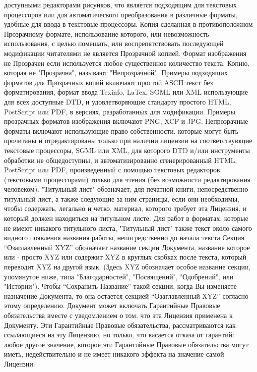  доступными редакторами рисунков, что является подходящим для текстовых процессоров или для автоматического преобразования
 в различные форматы, удобные для ввода в текстовые процессоры. Копия сделанная в противоположном Прозрачному формате,
 использование которого, или невозможность использования, с целью помешать, или воспрепятствовать последующей модификации
 читателями не является Прозрачной копией. Формат изображения не Прозрачен если используется любое существенное количество
 текста. Копию, которая не "Прозрачна", называют "Непрозрачной".
Примеры подходящих форматов для Прозрачных копий включают простой ASCII текст без форматирования, формат ввода Texinfo,
 LaTex, SGML или XML использующие для всех доступные DTD, и удовлетворяющие стандарту простого HTML, PostScript или PDF,
 в версиях, разработанных для модификации.
Примеры прозрачных форматов изображения включают PNG, XCF и JPG. Непрозрачные форматы включают использующие право
 собственности, которые могут быть прочитаны и отредактированы только при наличии лицензии на соответствующие текстовые
 процессоры, SGML или XML, для которого DTD и/или инструменты обработки не общедоступны, и  автоматизированно
 сгенерированный HTML, PostScript или PDF, произведенный с помощью текстовых редакторов (текстовыми процессорами)
 только для чтения (без возможности редактирования человеком).
"Титульный лист" обозначает, для печатной книги, непосредственно  титульный лист, а также следующие за ним страницы,
 если они необходимы, чтобы содержать, легально и четко, материал, которого  требует эта Лицензия, и который должен 
находиться на титульном листе. Для работ в форматах, которые не имеют никакого титульного листа,  "Титульный лист" 
также текст около самого видного появления названия работы, непосредственно до начала текста
Секция “Озаглавленный XYZ” обозначает название секции Документа, название которое или - просто XYZ или содержит XYZ 
в круглых скобках после текста, который переводит XYZ на другой язык. (Здесь XYZ обозначает особое название секции,
 упомянутое ниже, типа "Благодарностей", "Посвящений", "Одобрений", или "Истории"). Чтобы “Сохранить Название” такой
 секции, когда Вы изменяете назначение Документа, то она остается секцией “Озаглавленный XYZ” согласно этому определению.
Документ может включать Гарантийные Правовые обязательства вместе с уведомлением о том, что эта Лицензия применена к
 Документу. Эти Гарантийные Правовые обязательства, рассматриваются как ссылающиеся на эту Лицензию, но только, что
 касается отказа от гарантий: любое другое значение, которое эти Гарантийные Правовые обязательства могут иметь,
 недействительно и не имеет никакого эффекта на значение самой Лицензии.

